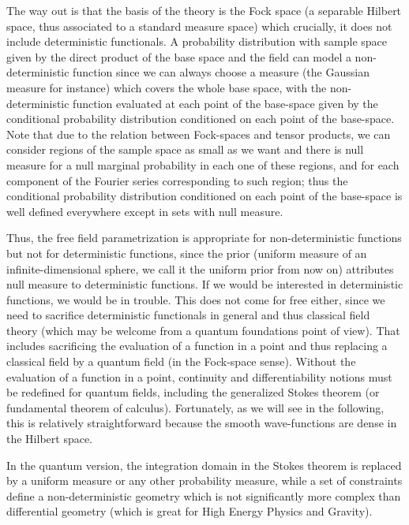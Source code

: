\documentclass[11pt]{book}
\begin{document}
The way out is that the basis of the theory is the Fock space (a
separable Hilbert space, thus associated to a standard measure space)
which crucially, it does not include deterministic functionals. A
probability distribution with sample space given by the direct product
of the base space and the field can model a non-deterministic function
since we can always choose a measure (the Gaussian measure for instance)
which covers the whole base space, with the non-deterministic function
evaluated at each point of the base-space given by the conditional
probability distribution conditioned on each point of the base-space.
Note that due to the relation between Fock-spaces and tensor products,
we can consider regions of the sample space as small as we want and
there is null measure for a null marginal probability in each one of
these regions, and for each component of the Fourier series
corresponding to such region; thus the conditional probability
distribution conditioned on each point of the base-space is well defined
everywhere except in sets with null measure.

Thus, the free field parametrization is appropriate for
non-deterministic functions but not for deterministic functions, since
the prior (uniform measure of an infinite-dimensional sphere, we call it
the uniform prior from now on) attributes null measure to deterministic
functions. If we would be interested in deterministic functions, we
would be in
trouble\cite{Baker1991ux201cLebesgue}\cite{Baker2004ux201cLebesgue}.
This does not come for free either, since we need to sacrifice
deterministic functionals in general and thus classical field theory
(which may be welcome from a quantum foundations point of view). That
includes sacrificing the evaluation of a function in a point and thus
replacing a classical field by a quantum field (in the Fock-space
sense). Without the evaluation of a function in a point, continuity and
differentiability notions must be redefined for quantum fields,
including the generalized Stokes theorem (or fundamental theorem of
calculus). Fortunately, as we will see in the following, this is
relatively straightforward because the smooth wave-functions are dense
in the Hilbert space.

In the quantum version, the integration domain in the Stokes theorem is
replaced by a uniform measure or any other probability measure, while a
set of constraints define a non-deterministic geometry which is not
significantly more complex than differential geometry (which is great
for High Energy Physics and Gravity).
\end{document}
